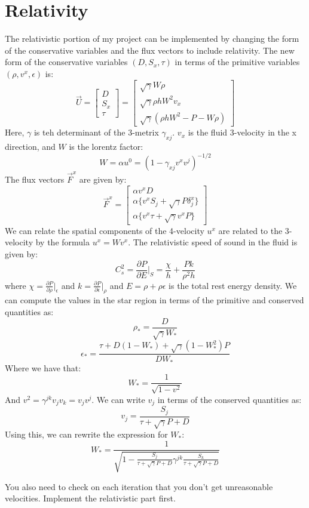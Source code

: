 \documentclass[a4paper]{article}
\begin{document}
\section{Relativity}
The relativistic portion of my project can be implemented by changing the form of the conservative variables and the flux vectors to include relativity. The new form of the conservative variables $(D,S_x,\tau )$ in terms of the primitive variables $(\rho , v^x, \epsilon )$ is:
$$\vec{U}=\begin{bmatrix}
        D \\ S_x \\ \tau
\end{bmatrix}=\begin{bmatrix}
        \sqrt{\gamma}W\rho \\ \sqrt{\gamma}\rho h W^2 v_x \\ \sqrt{\gamma}(\rho h W^2 - P - W\rho)
\end{bmatrix}$$
Here, $\gamma$ is teh determinant of the 3-metrix $\gamma_{xj}$. $v_x$ is the fluid 3-velocity in the x direction, and $W$ is the lorentz factor:
$$W=\alpha u^0 = (1-\gamma_{xj}v^xv^j)^{-1/2}$$
The flux vectors $\vec{F}^x$ are given by:
$$\vec{F}^x=\begin{bmatrix}
        \alpha v^x D \\ \alpha \{v^x S_j + \sqrt{\gamma}P \delta_j^x\} \\ \alpha \{v^x \tau + \sqrt{\gamma}v^x P\}
\end{bmatrix}$$
We can relate the spatial components of the 4-velocity $u^x$ are related to the 3-velocity by the formula $u^x=Wv^x$. The relativistic speed of sound in the fluid is given by:
$$C_s^2 = \frac{\partial P}{\partial E}|_S = \frac{\chi}{h}+\frac{Pk}{\rho^2 h}$$
where $\chi = \frac{\partial P}{\partial \rho}|_\epsilon$ and $k=\frac{\partial P}{\partial \epsilon}|_{\rho}$ and $E=\rho + \rho \epsilon$ is the total rest energy density. We can compute the values in the star region in terms of the primitive and conserved quantities as:
$$\rho_{*}=\frac{D}{\sqrt{\gamma}W_{*}}$$
$$\epsilon_{*}=\frac{\tau + D(1-W_{*})+\sqrt{\gamma}(1-W_{*}^2)P}{DW_{*}}$$
Where we have that:
$$W_{*}=\frac{1}{\sqrt{1-v^2}}$$
And $v^2=\gamma^{jk}v_jv_k=v_jv^j$. We can write $v_j$ in terms of the conserved quantities as:
$$v_j=\frac{S_j}{\tau+\sqrt{\gamma}P+D}$$
Using this, we can rewrite the expression for $W_{*}$:
$$W_{*}=\frac{1}{\sqrt{1-\frac{S_j}{\tau + \sqrt{\gamma}P+D}\gamma^{jk}\frac{S_k}{\tau+\sqrt{\gamma}P+D}}}$$

You also need to check on each iteration that you don't get unreasonable velocities. Implement the relativistic part first. 
\end{document}
